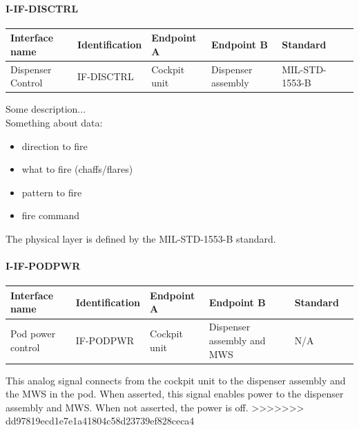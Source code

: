 \paragraph{I-IF-DISCTRL}

\begin{center}
\begin{tabular}{ | p{2cm} | l | p{2.3cm} | p{2.3cm} | l | p{1cm} |}
\hline
 \textbf{Interface name} & \textbf{Identification} & \textbf{Endpoint A} & \textbf{Endpoint B} & \textbf{Standard}\\ \hline

 Dispenser Control & IF-DISCTRL & Cockpit unit & Dispenser assembly & MIL-STD-1553-B\\ \hline
 
\end{tabular}
\end{center}

Some description...\\
Something about data:
\begin{itemize}
\item direction to fire
\item what to fire (chaffs/flares)
\item pattern to fire
\item fire command
\end{itemize}

The physical layer is defined by the MIL-STD-1553-B standard.

\paragraph{I-IF-PODPWR}

\begin{center}
\begin{tabular}{ | p{2cm} | l | p{2.3cm} | p{2.3cm} | l | p{1cm} |}
\hline
 \textbf{Interface name} & \textbf{Identification} & \textbf{Endpoint A} & \textbf{Endpoint B} & \textbf{Standard}\\ \hline

 Pod power control & IF-PODPWR & Cockpit unit & Dispenser assembly and MWS & N/A\\ \hline
 
\end{tabular}
\end{center}

This analog signal connects from the cockpit unit to the dispenser assembly and the MWS in the pod. When asserted, this signal enables power to the dispenser assembly and MWS. When not asserted, the power is off.
>>>>>>> dd97819ecd1e7e1a41804c58d23739ef828ceca4
